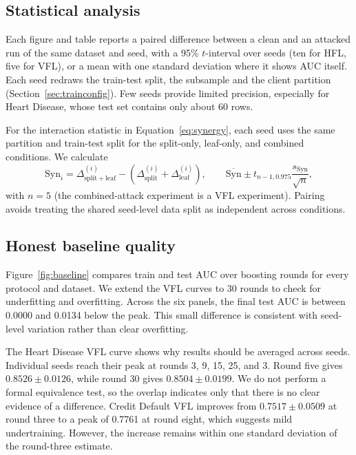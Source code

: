 \documentclass[11pt]{article}
\newcommand{\rev}[1]{{\color{blue}#1}}
\begin{document}
\subsection{Statistical analysis}
\label{sec:statmethod}

\rev{Each figure and table reports a paired difference between a clean and an attacked run of the same dataset and seed, with a 95\% $t$-interval over seeds (ten for HFL, five for VFL), or a mean with one standard deviation where it shows AUC itself. Each seed redraws the train-test split, the subsample and the client partition (Section~\ref{sec:trainconfig}).} Few seeds provide limited precision, especially for Heart Disease, whose test set contains only about 60 rows.

For the interaction statistic in Equation~\ref{eq:synergy}, each seed uses the same partition and train-test split for the split-only, leaf-only, and combined conditions. We calculate
\begin{equation}
\mathrm{Syn}_i
=\Delta_{\mathrm{split}+\mathrm{leaf}}^{(i)}
-\left(\Delta_{\mathrm{split}}^{(i)}+\Delta_{\mathrm{leaf}}^{(i)}\right),
\qquad
\overline{\mathrm{Syn}}
\mathbin{\pm}
t_{n-1,0.975}\frac{s_{\mathrm{Syn}}}{\sqrt{n}},
\label{eq:synergyci}
\end{equation}
with $n=5$ \rev{(the combined-attack experiment is a VFL experiment)}. Pairing avoids treating the shared seed-level data split as independent across conditions.

\subsection{Honest baseline quality}
\label{sec:baselinequality}

Figure~\ref{fig:baseline} compares train and test AUC over boosting rounds for every protocol and dataset. We extend the VFL curves to 30 rounds to check for underfitting and overfitting. Across the six panels, the final test AUC is between 0.0000 and 0.0134 below the peak. This small difference is consistent with seed-level variation rather than clear overfitting.

The Heart Disease VFL curve shows why results should be averaged across seeds. Individual seeds reach their peak at rounds 3, 9, 15, 25, and 3. Round five gives $0.8526\pm0.0126$, while round 30 gives $0.8504\pm0.0199$. We do not perform a formal equivalence test, so the overlap indicates only that there is no clear evidence of a difference. Credit Default VFL improves from $0.7517\pm0.0509$ at round three to a peak of 0.7761 at round eight, which suggests mild undertraining. However, the increase remains within one standard deviation of the round-three estimate.
\end{document}
